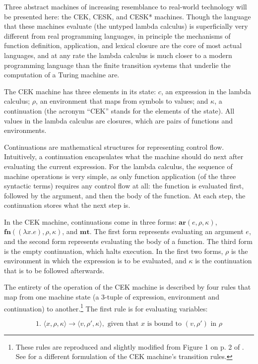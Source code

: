 \documentclass{article}
\begin{document}
Three abstract machines of increasing resemblance to real-world technology will be presented here: the CEK, CESK, and CESK* machines. Though the language that these machines evaluate (the untyped lambda calculus) is superficially very different from real programming languages, in principle the mechanisms of function definition, application, and lexical closure are the core of most actual languages, and at any rate the lambda calculus is much closer to a modern programming language than the finite transition systems that underlie the computation of a Turing machine are.

The CEK machine has three elements in its state: $c$, an expression in the lambda calculus; $\rho$, an environment that maps from symbols to values; and $\kappa$, a continuation (the acronym ``CEK'' stands for the elements of the state). All values in the lambda calculus are closures, which are pairs of functions and environments.

Continuations are mathematical structures for representing control flow. Intuitively, a continuation encapsulates what the machine should do next after evaluating the current expression. For the lambda calculus, the sequence of machine operations is very simple, as only function application (of the three syntactic terms) requires any control flow at all: the function is evaluated first, followed by the argument, and then the body of the function. At each step, the continuation stores what the next step is.

In the CEK machine, continuations come in three forms: $\textbf{ar}(e, \rho, \kappa)$, $\textbf{fn}((\lambda x.e), \rho, \kappa)$, and $\textbf{mt}$. The first form represents evaluating an argument $e$, and the second form represents evaluating the body of a function. The third form is the empty continuation, which halts execution. In the first two forms, $\rho$ is the environment in which the expression is to be evaluated, and $\kappa$ is the continuation that is to be followed afterwards.

The entirety of the operation of the CEK machine is described by four rules that map from one machine state (a 3-tuple of expression, environment and continuation) to another.\footnote{These rules are reproduced and slightly modified from Figure 1 on p. 2 of \cite{aam}. See \cite{cek} for a different formulation of the CEK machine's transition rules.} The first rule is for evaluating variables:

$$
\text{1. }
\langle x, \rho, \kappa \rangle
\to
\langle v, \rho', \kappa \rangle,
\text{ given that $x$ is bound to $(v, \rho')$ in $\rho$}
$$
\end{document}
